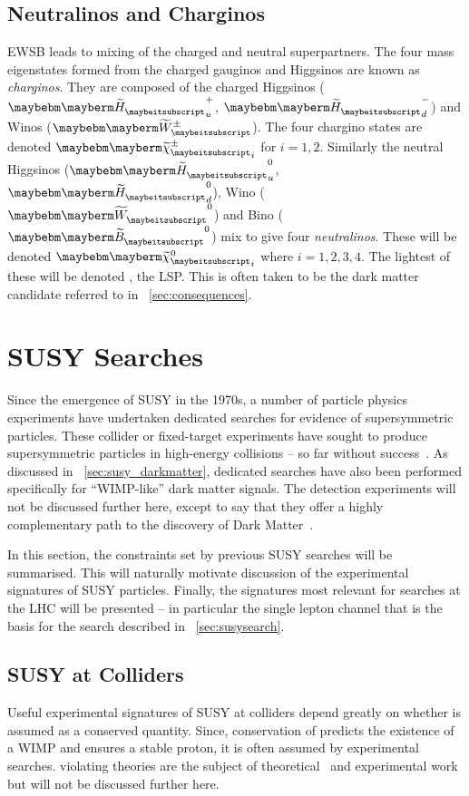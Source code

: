\subsection{Neutralinos and Charginos}
\ac{EWSB} leads to mixing of the charged and neutral \spinhalf
superpartners. The four mass eigenstates formed from the charged
gauginos and Higgsinos are known as \emph{charginos}. They are
composed of the charged Higgsinos ($\PSHiggs_u^+$, $\PSHiggs_d^-$) and
Winos ($\PSWpm$). The four chargino states are denoted
$\PScharginopm_i$ for $i=1,2$. Similarly the neutral Higgsinos
($\PSHiggs_u^0$, $\PSHiggs_d^0$), Wino ($\PSW^0$) and Bino ($\PSB^0$)
mix to give four \emph{neutralinos}. These will be denoted
$\PSneutralino_i$ where $i=1,2,3,4$. The lightest of these will be
denoted \PSneutralino, the \ac{LSP}. This is often taken to be the
dark matter candidate referred to in \sec~\ref{sec:consequences}.

\section{\acl{SUSY} Searches}
Since the emergence of \ac{SUSY} in the 1970s, a number of particle physics
experiments have undertaken dedicated searches for evidence of supersymmetric
particles. These collider or fixed-target experiments have sought to produce
supersymmetric particles in high-energy collisions -- so far without
success~\cite{ua1_susy,aleph_susy,d0_susy,hera_susy}. As discussed in
\sec~\ref{sec:susy_darkmatter}, dedicated searches have also been performed
specifically for ``\ac{WIMP}-like'' dark matter signals. The detection
experiments will not be discussed further here, except to say that they offer a
highly complementary path to the discovery of Dark
Matter~\cite{mastercode_2011}.

In this section, the constraints set by previous \ac{SUSY} searches will be
summarised. This will naturally motivate discussion of the experimental
signatures of \ac{SUSY} particles. Finally, the signatures most relevant for
searches at the \ac{LHC} will be presented -- in particular the single lepton
channel that is the basis for the search described in
\chap~\ref{sec:susysearch}.

\subsection{\acl{SUSY} at Colliders}
Useful experimental signatures of \ac{SUSY} at colliders depend greatly on
whether \Rparity is assumed as a conserved quantity. Since, conservation of
\Rparity predicts the existence of a \ac{WIMP} and ensures a stable proton, it
is often assumed by experimental searches. \Rparity violating theories are the
subject of theoretical~\cite{aulakh_rpv} and experimental work but will not be
discussed further here.

